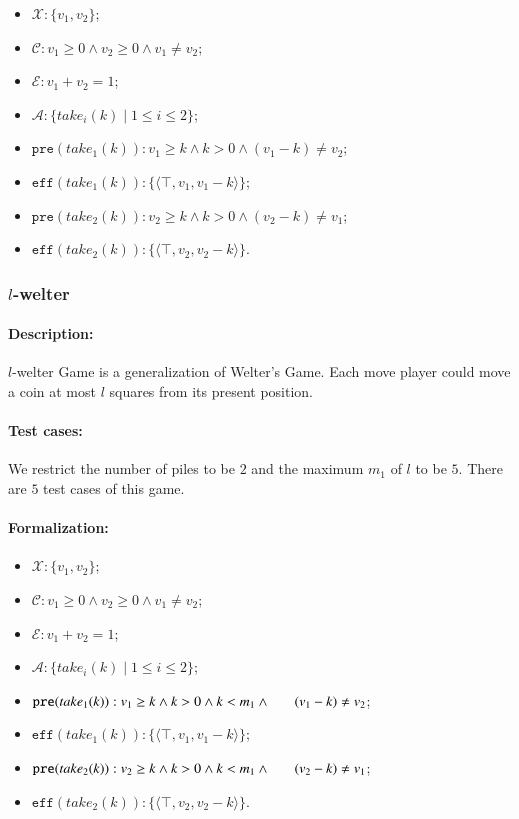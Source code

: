 \documentclass[review]{elsarticle}
\newcommand{\set}[1]{\{ #1 \}}
\newcommand{\tuple}[1]{\langle {#1} \rangle}
\newcommand{\true}{\top}
\newcommand{\statevar}{\mathcal{X}}
\newcommand{\act}{\mathcal{A}}
\newcommand{\constraint}{\mathcal{C}}
\newcommand{\estate}{\mathcal{E}}
\newcommand{\pre}{\mathtt{pre}}
\newcommand{\eff}{\mathtt{eff}}
\begin{document}
\begin{itemize}
	\item $\statevar: \set{v_1, v_2}$;
	\item $\constraint: v_1 \ge 0 \wedge v_2 \ge 0 \wedge v_1 \neq v_2$;
	\item $\estate:  v_1 + v_2  =1 $;
	\item $\act:\set{take_i(k){\mid}1\le i \le2}$;
	\item $\pre(take_1(k)) :  v_1 \ge k \wedge k > 0 \wedge (v_1-k) \neq v_2$;
	\item $\eff(take_1(k)) : \set{\tuple{\true,  v_1,  v_1 - k}}$;
	\item $\pre(take_2(k)) :  v_2 \ge k \wedge k > 0 \wedge (v_2-k) \neq v_1 $;
	\item $\eff(take_2(k)) : \set{\tuple{\true,  v_2,  v_2 - k}}$.
\end{itemize}


\subsubsection{$l$-welter \protect\cite{KahF1987}}

\paragraph{Description:} 
$l$-welter Game is a generalization of Welter’s Game.
Each move player could move a coin at most $l$ squares from its present position.

\paragraph{Test cases:}
We restrict the number of piles to be $2$ and the maximum $m_1$ of $l$ to be $5$.
There are $5$ test cases of this game.
\paragraph{Formalization:}

\begin{itemize}
	\item $\statevar: \set{v_1, v_2}$;
	\item $\constraint: v_1 \ge 0 \wedge v_2 \ge 0  \wedge v_1 \neq v_2$;
	\item $\estate: v_1+v_2= 1 $;
	\item $\act:\set{take_i(k){\mid}1\le i \le2}$;
	\item $\pre(take_1(k)) :  v_1 \ge k \wedge k > 0 \wedge k < m_1 \wedge \\ \hspace*{6mm}
	(v_1-k) \neq v_2 $;
	\item $\eff(take_1(k)) : \set{\tuple{\true,  v_1,  v_1 - k}}$;
	\item $\pre(take_2(k)) :  v_2 \ge k \wedge k > 0 \wedge k < m_1 \wedge \\\\ \hspace*{6mm}
	(v_2-k) \neq v_1 $;
	
	\item $\eff(take_2(k)) : \set{\tuple{\true,  v_2,  v_2 - k}}$.
\end{itemize}
\end{document}

